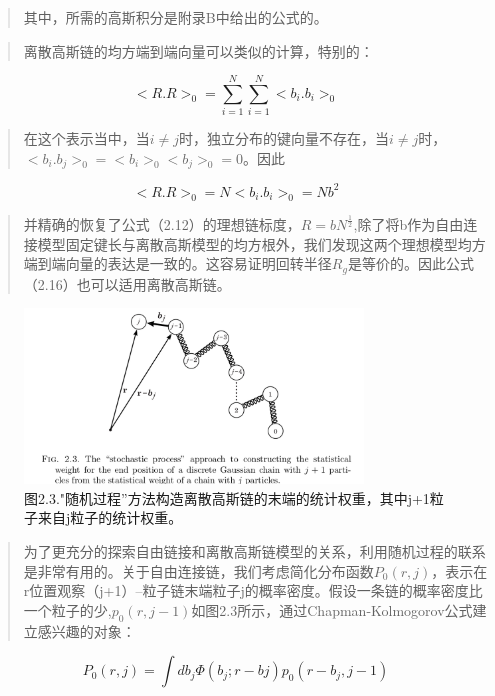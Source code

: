 			\begin{quotation}
				其中，所需的高斯积分是附录B中给出的公式的。
			\end{quotation}
			\begin{quotation}
				离散高斯链的均方端到端向量可以类似的计算，特别的：
			\end{quotation}
			\begin{equation}
			<R.R>_{0}=\sum_{i=1}^{N}\sum_{i=1}^{N}<b_{i}.b_{i}>_{0}
			\end{equation}
			\begin{quotation}
				在这个表示当中，当$i\neq j$时，独立分布的键向量不存在，当$i\neq j$时，$<b_{i}.b_{j}>_{0}=<b_{i}>_{0}<b_{j}>_{0}=0$。因此
			\end{quotation}
			\begin{equation}
			<R.R>_{0}=N<b_{i}.b_{i}>_{0}=Nb^2
			\end{equation}
			\begin{quotation}
				并精确的恢复了公式（2.12）的理想链标度，$R=bN^\frac{1}{2}$,除了将b作为自由连接模型固定键长与离散高斯模型的均方根外，我们发现这两个理想模型均方端到端向量的表达是一致的。这容易证明回转半径$R_{g}$是等价的。因此公式（2.16）也可以适用离散高斯链。
			\end{quotation}
			\begin{figure}
				\caption{图2.3."随机过程”方法构造离散高斯链的末端的统计权重，其中j+1粒子来自j粒子的统计权重。}
				\centering
				\includegraphics[width=9cm]{./figures/1.png}
			\end{figure}
			\newpage
			\begin{quotation}
				为了更充分的探索自由链接和离散高斯链模型的关系，利用随机过程的联系是非常有用的。关于自由连接链，我们考虑简化分布函数$P_{0}(r,j)$，表示在r位置观察（j+1）--粒子链末端粒子j的概率密度。假设一条链的概率密度比一个粒子的少,$p_{0}(r,j-1)$如图2.3所示，通过Chapman-Kolmogorov公式建立感兴趣的对象：
			\end{quotation}
			\begin{equation}
			P_{0}(r,j)=\int db_{j} \varPhi (b_{j};r-b{j})p_{0}(r-b_{j},j-1)
			\end{equation}
